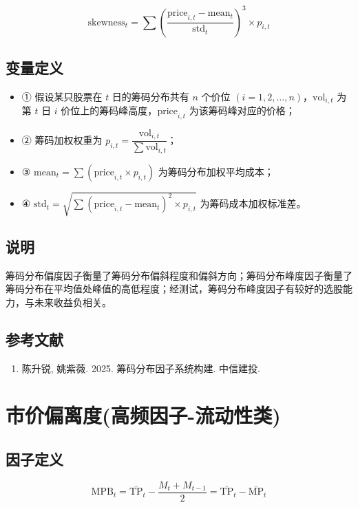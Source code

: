 \documentclass{article}
\begin{document}
\begin{equation}
    \mathrm{skewness}_t = \sum \left( \frac{\mathrm{price}_{i,t} - \mathrm{mean}_t}{\mathrm{std}_t} \right)^3 \times p_{i,t}
\end{equation}

\subsection{变量定义}
\begin{itemize}
    \item ① 假设某只股票在 \( t \) 日的筹码分布共有 \( n \) 个价位 \( (i=1,2,\ldots,n) \)，\( \mathrm{vol}_{i,t} \) 为第 \( t \) 日 \( i \) 价位上的筹码峰高度，\( \mathrm{price}_{i,t} \) 为该筹码峰对应的价格；
    \item ② 筹码加权权重为 \( p_{i,t} = \dfrac{\mathrm{vol}_{i,t}}{\sum \mathrm{vol}_{i,t}} \)；
    \item ③ \( \mathrm{mean}_t = \sum (\mathrm{price}_{i,t} \times p_{i,t}) \) 为筹码分布加权平均成本；
    \item ④ \( \mathrm{std}_t = \sqrt{\sum (\mathrm{price}_{i,t} - \mathrm{mean}_t)^2 \times p_{i,t}} \) 为筹码成本加权标准差。
\end{itemize}

\subsection{说明}
筹码分布偏度因子衡量了筹码分布偏斜程度和偏斜方向；筹码分布峰度因子衡量了筹码分布在平均值处峰值的高低程度；经测试，筹码分布峰度因子有较好的选股能力，与未来收益负相关。

\subsection{参考文献}
\begin{enumerate}
    \item 陈升锐, 姚紫薇. 2025. 筹码分布因子系统构建. 中信建投.
\end{enumerate}

\section{市价偏离度(高频因子-流动性类)}

\subsection{因子定义}
\begin{equation}
    \mathrm{MPB}_t = \overline{\mathrm{TP}}_t - \frac{M_t + M_{t-1}}{2} = \overline{\mathrm{TP}}_t - \overline{\mathrm{MP}}_t
\end{equation}
\end{document}

